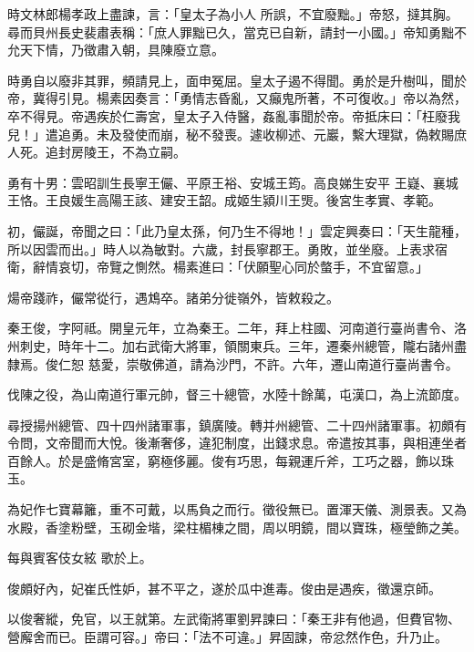 \begin{pinyinscope}
 時文林郎楊孝政上盡諫，言：「皇太子為小人
 所誤，不宜廢黜。」帝怒，撻其胸。尋而貝州長史裴肅表稱：「庶人罪黜已久，當克已自新，請封一小國。」帝知勇黜不允天下情，乃徵肅入朝，具陳廢立意。



 時勇自以廢非其罪，頻請見上，面申冤屈。皇太子遏不得聞。勇於是升樹叫，聞於帝，冀得引見。楊素因奏言：「勇情志昏亂，又癲鬼所著，不可復收。」帝以為然，卒不得見。帝遇疾於仁壽宮，皇太子入侍醫，姦亂事聞於帝。帝抵床曰：「枉廢我兒！」遣追勇。未及發使而崩，秘不發喪。遽收柳述、元巖，繫大理獄，偽敕賜庶人死。追封房陵王，不為立嗣。



 勇有十男：雲昭訓生長寧王儼、平原王裕、安城王筠。高良娣生安平
 王嶷、襄城王恪。王良媛生高陽王該、建安王韶。成姬生潁川王煚。後宮生孝實、孝範。



 初，儼誕，帝聞之曰：「此乃皇太孫，何乃生不得地！」雲定興奏曰：「天生龍種，所以因雲而出。」時人以為敏對。六歲，封長寧郡王。勇敗，並坐廢。上表求宿衛，辭情哀切，帝覽之惻然。楊素進曰：「伏願聖心同於螫手，不宜留意。」



 煬帝踐祚，儼常從行，遇鴆卒。諸弟分徙嶺外，皆敕殺之。



 秦王俊，字阿祗。開皇元年，立為秦王。二年，拜上柱國、河南道行臺尚書令、洛州刺史，時年十二。加右武衛大將軍，領關東兵。三年，遷秦州總管，隴右諸州盡隸焉。俊仁恕
 慈愛，崇敬佛道，請為沙門，不許。六年，遷山南道行臺尚書令。



 伐陳之役，為山南道行軍元帥，督三十總管，水陸十餘萬，屯漢口，為上流節度。



 尋授揚州總管、四十四州諸軍事，鎮廣陵。轉并州總管、二十四州諸軍事。初頗有令問，文帝聞而大悅。後漸奢侈，違犯制度，出錢求息。帝遣按其事，與相連坐者百餘人。於是盛脩宮室，窮極侈麗。俊有巧思，每親運斤斧，工巧之器，飾以珠玉。



 為妃作七寶幕籬，重不可戴，以馬負之而行。徵役無已。置渾天儀、測景表。又為水殿，香塗粉壁，玉砌金堦，梁柱楣棟之間，周以明鏡，間以寶珠，極瑩飾之美。



 每與賓客伎女絃
 歌於上。



 俊頗好內，妃崔氏性妒，甚不平之，遂於瓜中進毒。俊由是遇疾，徵還京師。



 以俊奢縱，免官，以王就第。左武衛將軍劉昇諫曰：「秦王非有他過，但費官物、營廨舍而已。臣謂可容。」帝曰：「法不可違。」昇固諫，帝忿然作色，升乃止。




\end{pinyinscope}
